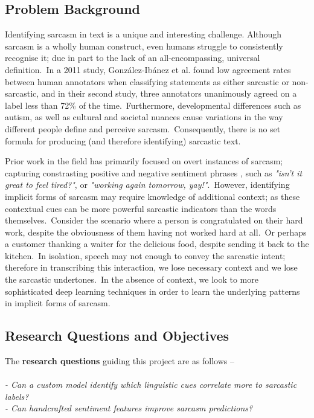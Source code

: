 \documentclass[12pt,a4paper]{article}
\begin{document}

\subsection{Problem Background}\vspace{-4.2pt}
\noindent Identifying sarcasm in text is a unique and interesting challenge. Although sarcasm is a wholly human construct, even humans struggle to consistently recognise it; due in part to the lack of an all-encompassing, universal definition.\ In a 2011 study, Gonz{\'a}lez-Ib{\'a}nez et al. \cite{gonzalez2011identifying} found low agreement rates between human annotators when classifying statements as either sarcastic or non-sarcastic, and in their second study, three annotators unanimously agreed on a label less than 72\% of the time.\ Furthermore, developmental differences such as autism, as well as cultural and societal nuances cause variations in the way different people define and perceive sarcasm.\ Consequently, there is no set formula for producing (and therefore identifying) sarcastic text.

Prior work in the field has primarily focused on overt instances of sarcasm; capturing constrasting positive and negative sentiment phrases \cite{riloff2013sarcasm}, such as \textit{"isn't it great to feel tired?"}, or \textit{"working again tomorrow, yay!"}.\ However, identifying implicit forms of sarcasm may require knowledge of additional context; as these contextual cues can be more powerful sarcastic indicators than the words themselves.\ Consider the scenario where a person is congratulated on their hard work, despite the obviousness of them having not worked hard at all.\ Or perhaps a customer thanking a waiter for the delicious food, despite sending it back to the kitchen.\ In isolation, speech may not enough to convey the sarcastic intent; therefore in transcribing this interaction, we lose necessary context and we lose the sarcastic undertones.\ In the absence of context, we look to more sophisticated deep learning techniques in order to learn the underlying patterns in implicit forms of sarcasm.

\subsection{Research Questions and Objectives}
\vspace{-6.2pt}
\noindent The \textbf{research questions} guiding this project are as follows --\\
\\ 
\indent \textit{- Can a custom model identify which linguistic cues correlate more to sarcastic labels?}\\
\indent \textit{- Can handcrafted sentiment features improve sarcasm predictions?}\\\vspace{-5pt}
\end{document}
